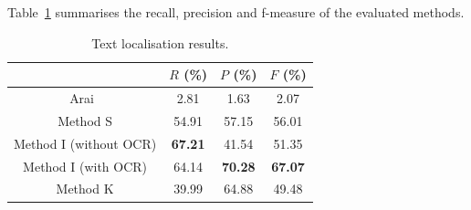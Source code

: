 Table~\ref{tab:text_results} summarises the recall, precision and f-measure of the evaluated methods.

  \begin{table}[ht]
    \normalsize
    \centering
    \caption{Text localisation results.}
    \begin{tabular}{|c|c|c|c|}
          \hline
          &  $R$ (\%)  & $P$ (\%)  & $F$ (\%)  \\
          \hline
          Arai~\cite{Arai11}  & 2.81    & 1.63      & 2.07       \\
          \hline
          Method S            & 54.91   & 57.15     & 56.01       \\
          \hline
          Method I (without OCR)  & \textbf{67.21}   & 41.54    & 51.35       \\
          \hline
          Method I (with OCR)  & 64.14   & \textbf{70.28}    & \textbf{67.07}       \\
          \hline
          Method K  & 39.99   & 64.88    & 49.48       \\
          \hline
        \end{tabular}
    \label{tab:text_results}
  \end{table}%


